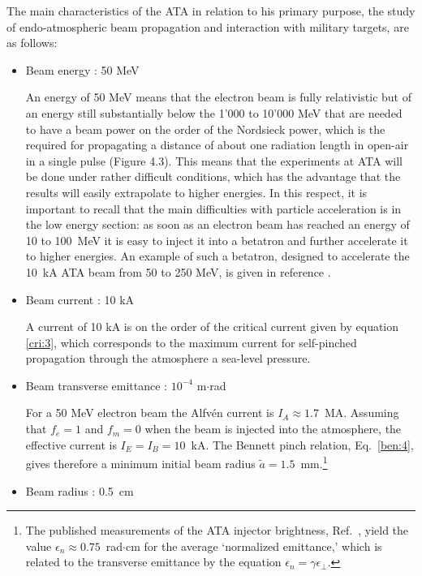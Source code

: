 \documentclass [12pt,a4paper,     ]{report} %
\begin{document}
The main characteristics of the ATA in relation to his primary purpose, the study of endo-atmospheric beam propagation and interaction with military targets, are as follows:


\begin{itemize}

\item  Beam energy : 50 MeV

An energy of 50 MeV means that the electron beam is fully relativistic but of an energy still substantially below the 1'000 to 10'000 MeV that are needed to have a beam power on the order of the Nordsieck power, which is the required for propagating a distance of about one radiation length in open-air in a single pulse (Figure 4.3).  This means that the experiments at ATA will be done under rather difficult conditions, which has the advantage that the results will easily extrapolate to higher energies.  In this respect, it is important to recall that the main difficulties with particle acceleration is in the low energy section: as soon as an electron beam has reached an energy of 10 to 100~MeV it is easy to inject it into a betatron and further accelerate it to higher energies.  An example of such a betatron, designed to accelerate the 10~kA ATA beam from 50 to 250 MeV, is given in reference \cite{PETER1983-}.


\item Beam current : 10 kA 

A current of 10 kA is on the order of the critical current given by equation \eqref{cri:3}, which corresponds to the maximum current for self-pinched propagation through the atmosphere a sea-level pressure.


\item Beam transverse emittance : $10^{-4}$ m$\cdot$rad

For a 50 MeV electron beam the Alfv\'en current is $I_A \approx 1.7$~MA. Assuming that $f_e=1$ and $f_m=0$ when the beam is injected into the atmosphere, the effective current is $I_E=I_B=10$~kA.  The Bennett pinch relation, Eq.~\eqref{ben:4}, gives therefore a minimum initial beam radius $\tilde{a}=1.5$~mm.\footnote{The published measurements of the ATA injector brightness, Ref.~\cite{WEIR-1985-}, yield the value $\epsilon_n \approx 0.75$~rad$\cdot$cm for the average `normalized emittance,' which is related to the transverse emittance by the equation $\epsilon_n = \gamma\epsilon_{\perp}$.}

\item Beam radius : 0.5~cm


\end{itemize}
\end{document}
